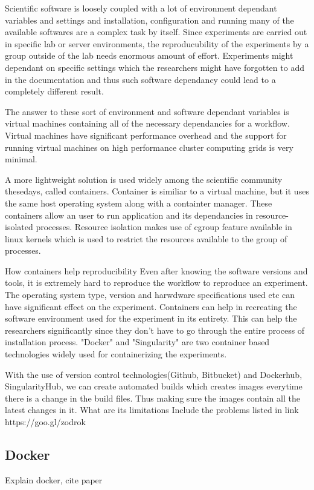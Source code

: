 Scientific software is loosely coupled with a lot of environment dependant variables and settings and installation, configuration and running many of the available softwares are a complex task by itself. Since experiments are carried out in specific lab or server environments, the reproducubility of the experiments by a group outside of the lab needs enormous amount of effort. Experiments might dependant on specific settings which the researchers might have forgotten to add in the documentation and thus such software dependancy could lead to a completely different result. 

The answer to these sort of environment and software dependant variables is virtual machines containing all of the necessary dependancies for a workflow. Virtual machines have significant performance overhead and the support for running virtual machines on high performance cluster computing grids is very minimal.

A more lightweight solution is used widely among the scientific community thesedays, called containers. Container is similiar to a virtual machine, but it uses the same host operating system along with a containter manager. These containers allow an user to run application and its dependancies in resource-isolated processes. Resource isolation makes use of cgroup feature available in linux kernels which is used to restrict the resources available to the group of processes.

How containers help reproducibility
Even after knowing the software versions and tools, it is extremely hard to reproduce the workflow to reproduce an experiment. The operating system type, version and harwdware specifications used etc can have significant effect on the experiment. Containers can help in recreating the software environment used for the experiment in its entirety. This can help the researchers significantly since they don't have to go through the entire process of installation process. "Docker" and "Singularity" are two container based technologies widely used for containerizing the experiments.

With the use of version control technologies(Github, Bitbucket) and Dockerhub, SingularityHub, we can create automated builds which creates images everytime there is a change in the build files. Thus making sure the images contain all the latest changes in it. 
What are its limitations
Include the problems listed in link https://goo.gl/zodrok
\subsection{Docker}
Explain docker, cite paper
